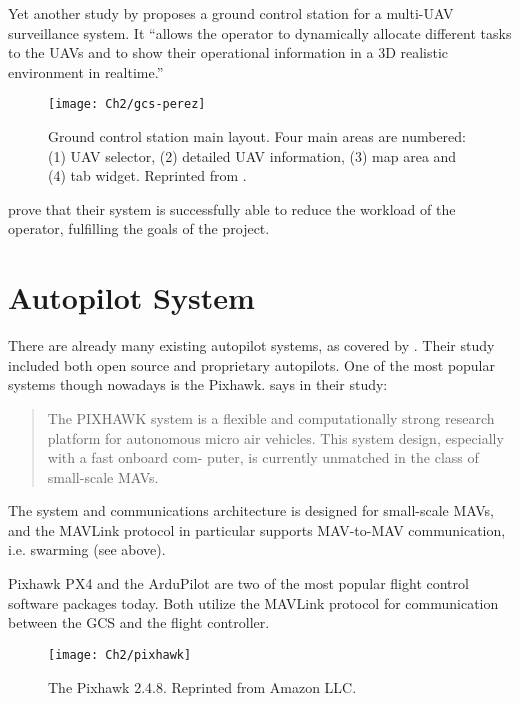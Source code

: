 Yet another study by  proposes a ground control station for a multi-UAV surveillance system. It ``allows the operator to dynamically allocate different tasks to the UAVs and to show their operational information in a 3D realistic environment in realtime.'' 

\begin{figure}[t]
	\centering\texttt{[image: Ch2/gcs-perez]}
	\caption[Ground control station main layout] {\small Ground control station main layout. Four main areas are numbered: (1) UAV selector, (2) detailed UAV information, (3) map area and (4) tab widget. Reprinted from \protect{}.}
	\label{fig:pixhawk}
\end{figure}
\FloatBarrier

 prove that their system is successfully able to reduce the workload of the operator, fulfilling the goals of the project.

\section{Autopilot System}
\label{sect:autopilot}

There are already many existing autopilot systems, as covered by . Their study included both open source and proprietary autopilots. One of the most popular systems though nowadays is the Pixhawk.  says in their study:

\begin{quote}
    The PIXHAWK system is a flexible and computationally
strong research platform for autonomous micro air vehicles.
This system design, especially with a fast onboard com-
puter, is currently unmatched in the class of small-scale
MAVs.
\end{quote}

The system and communications architecture is designed for small-scale MAVs, and the MAVLink protocol in particular supports MAV-to-MAV communication, i.e. swarming (see above). 

Pixhawk PX4 and the ArduPilot are two of the most popular flight control software packages today. Both utilize the MAVLink protocol for communication between the GCS and the flight controller.

\begin{figure}[t]
	\centering\texttt{[image: Ch2/pixhawk]}
	\caption{The Pixhawk 2.4.8. Reprinted from Amazon LLC.}
	\label{fig:pixhawk}
\end{figure}
\FloatBarrier

